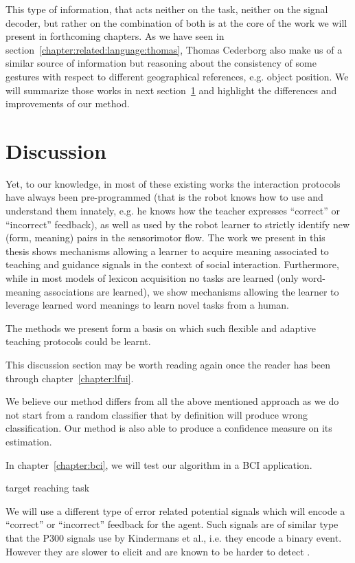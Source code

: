 \transition

This type of information, that acts neither on the task, neither on the signal decoder, but rather on the combination of both is at the core of the work we will present in forthcoming chapters. As we have seen in section~\ref{chapter:related:language:thomas}, Thomas Cederborg also make us of a similar source of information but reasoning about the consistency of some gestures with respect to different geographical references, e.g. object position. We will summarize those works in next section~\ref{chapter:related:discussion} and highlight the differences and improvements of our method.

\section{Discussion}
\label{chapter:related:discussion}


Yet, to our knowledge, in most of these existing works the interaction protocols have always been pre-programmed (that is the robot knows how to use and understand them innately, e.g. he knows how the teacher expresses ``correct'' or ``incorrect'' feedback), as well as used by the robot learner to strictly identify new (form, meaning) pairs in the sensorimotor flow. The work we present in this thesis shows mechanisms allowing a learner to acquire meaning associated to teaching and guidance signals in the context of social interaction. Furthermore, while in most models of lexicon acquisition no tasks are learned (only word-meaning associations are learned), we show mechanisms allowing the learner to leverage learned word meanings to learn novel tasks from a human.

The methods we present form a basis on which such flexible and adaptive teaching protocols could be learnt.


This discussion section may be worth reading again once the reader has been through chapter~\ref{chapter:lfui}.

We believe our method differs from all the above mentioned approach as we do not start from a random classifier that by definition will produce wrong classification. Our method is also able to produce a confidence measure on its estimation.

In chapter~\ref{chapter:bci}, we will test our algorithm in a BCI application. 

target reaching task

We will use a different type of error related potential signals which will encode a ``correct'' or ``incorrect'' feedback for the agent. Such signals are of similar type that the P300 signals use by Kindermans et al., i.e. they encode a binary event. However they are slower to elicit and are known to be harder to detect .

